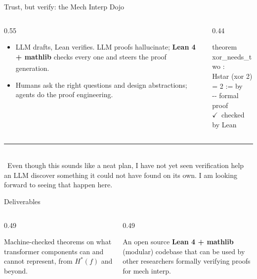 \documentclass[aspectratio=169, 11pt, t]{beamer}
\newcommand{\acc}[1]{{\color{miaccent}#1}}          %
\newcommand{\pop}[1]{{\color{misharp}\textbf{#1}}}
\begin{document}
\begin{frame}{Trust, but verify: the Mech Interp Dojo}
  \begin{columns}[T]
    \begin{column}{0.55\textwidth}
      \begin{itemize}
        \item \acc{LLM drafts, Lean verifies.} LLM proofs hallucinate; \pop{Lean 4 + mathlib} checks every one and steers the proof generation.\textsuperscript{\textcolor{misharp}{\dag}}
        \item Humans ask the right questions and design abstractions; agents do the proof engineering.
      \end{itemize}
    \end{column}
    \begin{column}{0.44\textwidth}
      \begin{codebox}
        \textcolor{miaccent}{theorem} xor\_needs\_two :\\
        \hspace*{1.2em}Hstar (xor 2) = 2 := \textcolor{miaccent}{by}\\
        \hspace*{1.2em}\textcolor{mimuted}{-{}- formal proof}\\[5pt]
        {\color{green!55!black}$\checkmark$}~\textcolor{mimuted}{checked by Lean}
      \end{codebox}
    \end{column}
  \end{columns}
  \vfill
  {\footnotesize\color{mimuted}%
  \rule{0.32\linewidth}{0.3pt}\\[2pt]
  \textcolor{misharp}{\dag}~Even though this sounds like a neat plan, I have not yet seen verification help an LLM discover something it could not have found on its own. I am looking forward to seeing that happen here.\par}
\end{frame}

\begin{frame}{Deliverables}
  \begin{columns}[T]
    \begin{column}{0.49\textwidth}
      \begin{card}[title=A library of theorems, equal height group=deliv]
        Machine-checked theorems on \acc{what transformer components can and cannot represent}, from $H^{*}(f)$ and beyond. 
      \end{card}
    \end{column}
    \begin{column}{0.49\textwidth}
      \begin{card}[title=The Mech Interp Dojo, equal height group=deliv]
        An open source \pop{Lean 4 + mathlib} (modular) codebase that can be used by other researchers formally verifying proofs for mech interp.
      \end{card}
    \end{column}
  \end{columns}
\end{frame}
\end{document}
